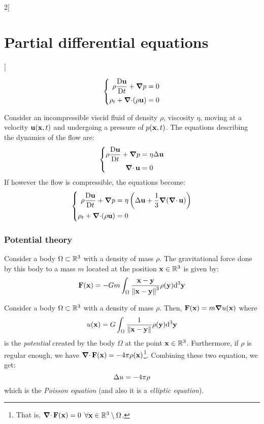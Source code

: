\documentclass[../../../main_math.tex]{subfiles}
\begin{document}
\begin{multicols}{2}[\section{Partial differential equations}]
\begin{theorem}
\begin{equation*}
      \left\{
      \begin{aligned}
        \rho\frac{\mathrm{D}\boldsymbol{\mathrm{u}}}{\mathrm{D}t}+\grad p & =0 \\
        \rho_t+\operatorname{\boldsymbol{\mathrm{\nabla}}\cdot}(\rho\boldsymbol{\mathrm{u}})      & =0
      \end{aligned}
      \right.
    \end{equation*}
  \end{theorem}
  \begin{theorem}
    Consider an incompressible viscid fluid of density $\rho$, viscosity $\eta$, moving at a velocity $\boldsymbol{\mathrm{u}}(\boldsymbol{\mathrm{x}},t)$ and undergoing a pressure of $p(\boldsymbol{\mathrm{x}},t)$. The equations describing the dynamics of the flow are:
    \begin{equation*}
      \left\{
      \begin{aligned}
        \rho\frac{\mathrm{D}\boldsymbol{\mathrm{u}}}{\mathrm{D}t}+\grad p & =\eta\Delta\boldsymbol{\mathrm{u}} \\
        \operatorname{\boldsymbol{\mathrm{\nabla}}\cdot}{\boldsymbol{\mathrm{u}}}                 & =0
      \end{aligned}
      \right.
    \end{equation*}
    If however the flow is compressible, the equations become:
    \begin{equation*}
      \left\{
      \begin{aligned}
        \rho\frac{\mathrm{D}\boldsymbol{\mathrm{u}}}{\mathrm{D}t}+\grad p & =\eta\left(\Delta\boldsymbol{\mathrm{u}}+\frac{1}{3}\grad(\operatorname{\boldsymbol{\mathrm{\nabla}}\cdot}{\boldsymbol{\mathrm{u}}})\right) \\
        \rho_t+\operatorname{\boldsymbol{\mathrm{\nabla}}\cdot}(\rho\boldsymbol{\mathrm{u}})      & =0
      \end{aligned}
      \right.
    \end{equation*}
  \end{theorem}
  \subsubsection{Potential theory}
  \begin{proposition}
    Consider a body $\Omega\subset\mathbb{R}^3$ with a density of mass $\rho$. The gravitational force done by this body to a mass $m$ located at the position $\boldsymbol{\mathrm{x}}\in\mathbb{R}^3$ is given by:
    $$\boldsymbol{\mathrm{F}}(\boldsymbol{\mathrm{x}})=-Gm\int_{\Omega}\frac{\boldsymbol{\mathrm{x}}-\boldsymbol{\mathrm{y}}}{{\left\|\boldsymbol{\mathrm{x}}-\boldsymbol{\mathrm{y}}\right\|}^3}\rho(\boldsymbol{\mathrm{y}})\dd^3{\boldsymbol{\mathrm{y}}}$$
  \end{proposition}
  \begin{proposition}
    Consider a body $\Omega\subset\mathbb{R}^3$ with a density of mass $\rho$. Then, $\boldsymbol{\mathrm{F}}(\boldsymbol{\mathrm{x}})=m\grad{u(\boldsymbol{\mathrm{x}})}$ where $$u(\boldsymbol{\mathrm{x}})=G\int_{\Omega}\frac{1}{\left\|\boldsymbol{\mathrm{x}}-\boldsymbol{\mathrm{y}}\right\|}\rho(\boldsymbol{\mathrm{y}})\dd^3{\boldsymbol{\mathrm{y}}}$$ is the \emph{potential} created by the body $\Omega$ at the point $\boldsymbol{\mathrm{x}}\in\mathbb{R}^3$. Furthermore, if $\rho$ is regular enough, we have $\operatorname{\boldsymbol{\mathrm{\nabla}}\cdot}\boldsymbol{\mathrm{F}}(\boldsymbol{\mathrm{x}})=-4\pi\rho(\boldsymbol{\mathrm{x}})$\footnote{That is, $\operatorname{\boldsymbol{\mathrm{\nabla}}\cdot}\boldsymbol{\mathrm{F}}(\boldsymbol{\mathrm{x}})=0$ $\forall\boldsymbol{\mathrm{x}}\in\mathbb{R}^3\setminus\Omega$.}. Combining these two equation, we get: $$\Delta u=-4\pi\rho$$ which is the \emph{Poisson equation} (and also it is a \emph{elliptic equation}).
  \end{proposition}

\end{multicols}
\end{document}
